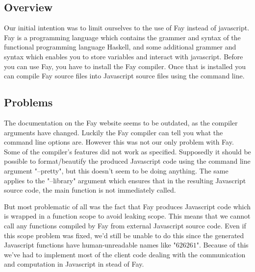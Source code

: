 \subsection{Overview}
Our initial intention was to limit ourselves to the use of Fay \cite{Fay}
instead of javascript. Fay is a programming language which contains the grammer
and syntax of the functional programming language Haskell, and some additional
grammer and syntax which enables you to store variables and interact with
javascript. Before you can use Fay, you have to install the Fay compiler. Once
that is installed you can compile Fay source files into Javascript source files
using the command line. 

\subsection{Problems}
The documentation on the Fay website seems to be
outdated, as the compiler arguments have changed. Luckily the Fay compiler can
tell you what the command line options are. However this was not our only
problem with Fay. Some of the compiler's features did not work as specified.
Supposedly it should be possible to format/beautify the produced Javascript code
using the command line argument "--pretty", but this doesn't seem to be doing
anything. The same applies to the "--library" argument which ensures that in the
resulting Javascript source code, the main function is not immediately called.

But most problematic of all was the fact that Fay produces Javascript code which
is wrapped in a function scope to avoid leaking scope. This means that we cannot
call any functions compiled by Fay from external Javascript source code. Even if
this scope problem was fixed, we'd still be unable to do this since the
generated Javascript functions have human-unreadable names like "$62$$62$$61$".
Because of this we've had to implement most of the client code dealing with the
communication and computation in Javascript in stead of Fay.
